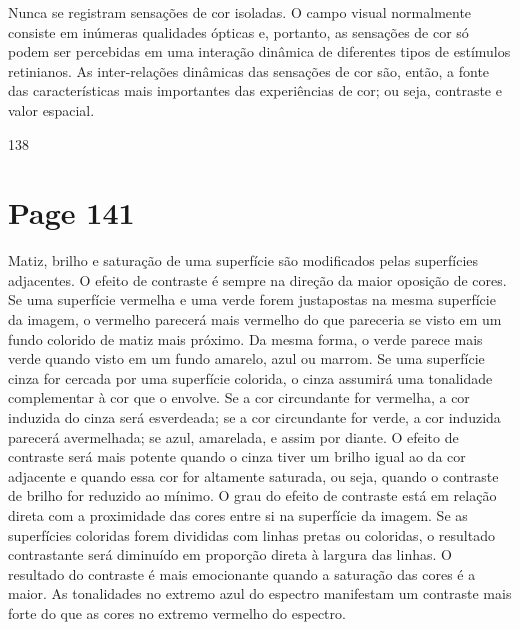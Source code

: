 \documentclass[a4paper]{article}
\begin{document}
Nunca se registram sensações de cor isoladas. O campo visual normalmente consiste em inúmeras qualidades ópticas e, portanto, as sensações de cor só podem ser percebidas em uma interação dinâmica de diferentes tipos de estímulos retinianos. As inter-relações dinâmicas das sensações de cor são, então, a fonte das características mais importantes das experiências de cor; ou seja, contraste e valor espacial.

138

\newpage
\section*{Page 141}

Matiz, brilho e saturação de uma superfície são modificados pelas superfícies adjacentes. O efeito de contraste é sempre na direção da maior oposição de cores. Se uma superfície vermelha e uma verde forem justapostas na mesma superfície da imagem, o vermelho parecerá mais vermelho do que pareceria se visto em um fundo colorido de matiz mais próximo. Da mesma forma, o verde parece mais verde quando visto em um fundo amarelo, azul ou marrom. Se uma superfície cinza for cercada por uma superfície colorida, o cinza assumirá uma tonalidade complementar à cor que o envolve. Se a cor circundante for vermelha, a cor induzida do cinza será esverdeada; se a cor circundante for verde, a cor induzida parecerá avermelhada; se azul, amarelada, e assim por diante. O efeito de contraste será mais potente quando o cinza tiver um brilho igual ao da cor adjacente e quando essa cor for altamente saturada, ou seja, quando o contraste de brilho for reduzido ao mínimo. O grau do efeito de contraste está em relação direta com a proximidade das cores entre si na superfície da imagem. Se as superfícies coloridas forem divididas com linhas pretas ou coloridas, o resultado contrastante será diminuído em proporção direta à largura das linhas. O resultado do contraste é mais emocionante quando a saturação das cores é a maior. As tonalidades no extremo azul do espectro manifestam um contraste mais forte do que as cores no extremo vermelho do espectro.
\end{document}
